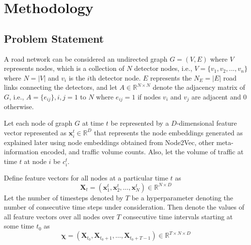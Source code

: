 \chapter{Methodology}\label{chap2}

\section{\textbf{Problem Statement}}

A road network can be considered an undirected graph $G = (V, E)$ where $V$ represents nodes, which is a collection of $N$ detector nodes, i.e., $V=\{v_1,v_2,...,v_n\}$ where $N = |V|$ and $v_i$ is the $i$th detector node. $E$ represents the $N_E = |E|$ road links connecting the detectors, and let $A \in \mathbb{R}^{N \times N}$ denote the adjacency matrix of $G$, i.e., $A = \{e_{ij}\}, i,j=1$ to $N$ where $e_{ij} = 1$ if nodes $v_i$ and $v_j$ are adjacent and $0$ otherwise.

Let each node of graph $G$ at time $t$ be represented by a $D$-dimensional feature vector represented as $\mathbf{x}_i^t \in \mathbb{R}^D$ that represents the node embeddings generated as explained later using node embeddings obtained from Node2Vec, other meta-information encoded, and traffic volume counts. Also, let the volume of traffic at time $t$ at node $i$ be $c_i^t$.

Define feature vectors for all nodes at a particular time $t$ as
\begin{equation*}
    \mathbf{X}_t = (\mathbf{x}_1^t, \mathbf{x}_2^t, \ldots, \mathbf{x}_N^t) \in \mathbb{R}^{N \times D} \tag{1}
\end{equation*}
Let the number of timesteps denoted by $T$ be a hyperparameter denoting the number of consecutive time steps under consideration. Then denote the values of all feature vectors over all nodes over $T$ consecutive time intervals starting at some time $t_0$ as
\begin{equation}
    \bm{\chi} = (\mathbf{X}_{t_0}, \mathbf{X}_{t_0+1}, \ldots, \mathbf{X}_{t_0+T-1}) \in \mathbb{R}^{T \times N \times D} \tag{2}
\end{equation}

